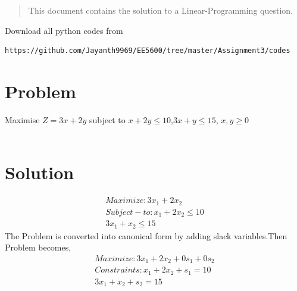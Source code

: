 \begin{enumerate}[label=\thesection.\arabic*.,ref=\thesection.\theenumi]

\begin{abstract}
This document contains the solution to a Linear-Programming question.\\
\end{abstract}
Download all python codes from 
\begin{lstlisting}
https://github.com/Jayanth9969/EE5600/tree/master/Assignment3/codes
\end{lstlisting}

\section{Problem}
Maximise $Z=3x+2y$ subject to $x+2y \leq 10$,$3x+y \leq 15$, $x,y \geq 0$ \\ \\

\section{Solution}

\begin{enumerate}
    \begin{align}
        Maximize : 3x_1 + 2x_2 \\
        Subject-to:
        x_1 + 2x_2  \leq 10 \\
        3x_1 + x_2 \leq 15 
    \end{align}
    The Problem is converted into canonical form by adding slack variables.Then Problem becomes,\\
    \begin{align}
        Maximize : 3x_1 + 2x_2 + 0s_1 + 0s_2\\
        Constraints :
        x_1 + 2x_2 + s_1 = 10 \\
        3x_1 + x_2 + s_2 = 15 
    \end{align}
        

\end{enumerate}
\end{enumerate}
